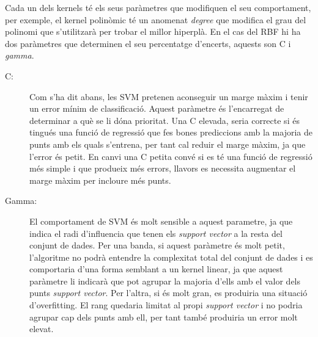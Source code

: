 \documentclass[10pt,a4paper,twocolumn,twoside]{article}
\begin{document}
Cada un dels kernels té els seus paràmetres que modifiquen el seu comportament, per exemple, el kernel polinòmic té un anomenat \textit{degree} que modifica el grau del polinomi que s'utilitzarà per trobar el millor hiperplà. En el cas del RBF hi ha dos paràmetres que determinen el seu percentatge d'encerts, aquests son C i \textit{gamma}.
\begin{description}
\item[C:] Com s'ha dit abans, les SVM pretenen aconseguir un marge màxim i tenir un error mínim de classificació. Aquest paràmetre és l'encarregat de determinar a què se li dóna prioritat. Una C elevada, seria correcte si és tingués una funció de regressió que fes bones prediccions amb la majoria de punts amb els quals s'entrena, per tant cal reduir el marge màxim, ja que l'error és petit. En canvi una C petita convé si es té una funció de regressió més simple i que produeix més errors, llavors es necessita augmentar el marge màxim per incloure més punts.
\item[Gamma:] El comportament de SVM és molt sensible a aquest parametre, ja que indica el radi d'influencia que tenen els \textit{support vector} a la resta del conjunt de dades. Per una banda, si aquest paràmetre és molt petit, l'algoritme no podrà entendre la complexitat total del conjunt de dades i es comportaria d'una forma semblant a un kernel linear, ja que aquest paràmetre li indicarà que pot agrupar la majoria d'ells amb el valor dels punts \textit{support vector}. Per l'altra, si és molt gran, es produiria una situació d'overfitting. El rang quedaria limitat al propi \textit{support vector} i no podria agrupar cap dels punts amb ell, per tant també produiria un error molt elevat.
\end{description}
\end{document}
